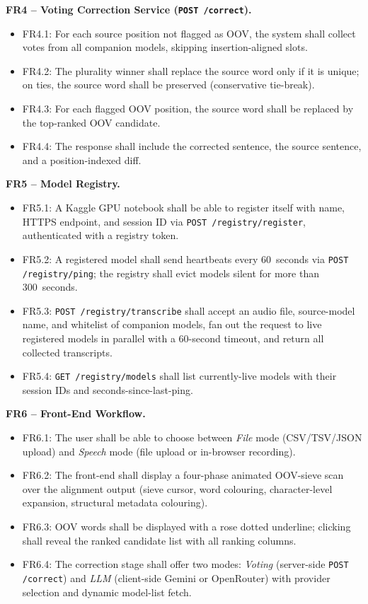 \textbf{FR4 -- Voting Correction Service (\texttt{POST /correct}).}
\begin{itemize}[nosep]
  \item FR4.1: For each source position not flagged as OOV, the system shall collect votes from all companion models, skipping insertion-aligned slots.
  \item FR4.2: The plurality winner shall replace the source word only if it is unique; on ties, the source word shall be preserved (conservative tie-break).
  \item FR4.3: For each flagged OOV position, the source word shall be replaced by the top-ranked OOV candidate.
  \item FR4.4: The response shall include the corrected sentence, the source sentence, and a position-indexed diff.
\end{itemize}

\textbf{FR5 -- Model Registry.}
\begin{itemize}[nosep]
  \item FR5.1: A Kaggle GPU notebook shall be able to register itself with name, HTTPS endpoint, and session ID via \texttt{POST /registry/register}, authenticated with a registry token.
  \item FR5.2: A registered model shall send heartbeats every 60~seconds via \texttt{POST /registry/ping}; the registry shall evict models silent for more than 300~seconds.
  \item FR5.3: \texttt{POST /registry/transcribe} shall accept an audio file, source-model name, and whitelist of companion models, fan out the request to live registered models in parallel with a 60-second timeout, and return all collected transcripts.
  \item FR5.4: \texttt{GET /registry/models} shall list currently-live models with their session IDs and seconds-since-last-ping.
\end{itemize}

\textbf{FR6 -- Front-End Workflow.}
\begin{itemize}[nosep]
  \item FR6.1: The user shall be able to choose between \emph{File} mode (CSV/TSV/JSON upload) and \emph{Speech} mode (file upload or in-browser recording).
  \item FR6.2: The front-end shall display a four-phase animated OOV-sieve scan over the alignment output (sieve cursor, word colouring, character-level expansion, structural metadata colouring).
  \item FR6.3: OOV words shall be displayed with a rose dotted underline; clicking shall reveal the ranked candidate list with all ranking columns.
  \item FR6.4: The correction stage shall offer two modes: \emph{Voting} (server-side \texttt{POST /correct}) and \emph{LLM} (client-side Gemini or OpenRouter) with provider selection and dynamic model-list fetch.
\end{itemize}

